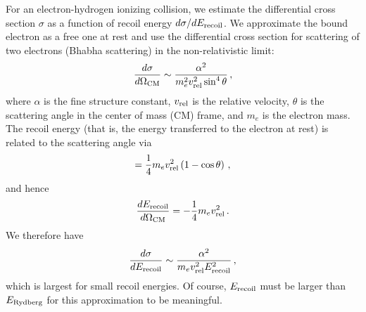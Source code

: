\documentclass[iop,numberedappendix,apj]{emulateapj}
\begin{document}
For an electron-hydrogen ionizing collision, we estimate the differential cross section $\sigma$ as a function of recoil energy $d\sigma / dE_{\rm recoil}$.
We approximate the bound electron as a free one at rest and use the differential cross section for scattering of two electrons (Bhabha scattering) in the non-relativistic limit:
\begin{equation}
\label{eq:dsig/dOmeg} \frac{d\sigma}{d\Omega_{\rm CM}} \sim \frac{\alpha^2}{m_e^2 v_{\rm rel}^2 \sin^4 \theta} \, ,
\end{equation}
where $\alpha$ is the fine structure constant, $v_{\rm rel}$ is the relative velocity, $\theta$ is the scattering angle in the center of mass (CM) frame, and $m_e$ is the electron mass.
The recoil energy (that is, the energy transferred to the electron at rest) is related to the scattering angle via
\begin{equation}
  \label{eq:Erec} = \frac{1}{4} m_e v_{\rm rel}^2 \left( 1 - \cos \theta \right) \, ,
\end{equation}
and hence
\begin{equation}
  \label{eq:dErec/dOmeg} \frac{dE_{\rm recoil}}{d\Omega_{\rm CM}} = -\frac{1}{4} m_e v_{\rm rel}^2 \, .
\end{equation}
We therefore have
\begin{equation}
  \label{eq:dsig/dErec} \frac{d\sigma}{dE_{\rm recoil}} \sim \frac{\alpha^2}{m_e v_{\rm rel}^2 E_{\rm recoil}^2} \, ,
\end{equation}
which is largest for small recoil energies.
Of course, $E_{\rm recoil}$ must be larger than $E_{\rm Rydberg}$ for this approximation to be meaningful.
\end{document}
